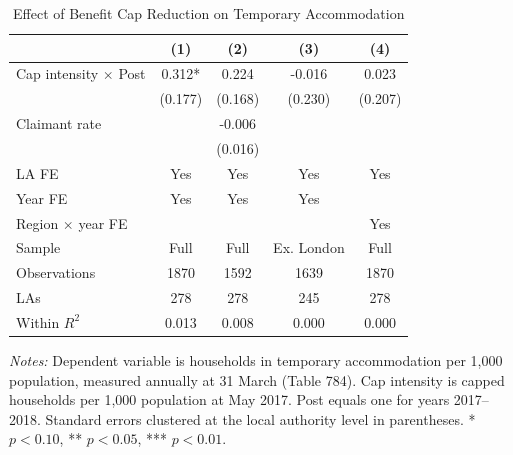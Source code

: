 \begin{table}[t]
\centering
\caption{Effect of Benefit Cap Reduction on Temporary Accommodation}
\label{tab:main}
\begin{tabular}{lcccc}
\toprule
& (1) & (2) & (3) & (4) \\
\midrule
Cap intensity $\times$ Post & 0.312* & 0.224 & -0.016 & 0.023 \\
& (0.177) & (0.168) & (0.230) & (0.207) \\
\addlinespace
Claimant rate & & -0.006 & & \\
& & (0.016) & & \\
\midrule
LA FE & Yes & Yes & Yes & Yes \\
Year FE & Yes & Yes & Yes & \\
Region $\times$ year FE & & & & Yes \\
Sample & Full & Full & Ex. London & Full \\
Observations & 1870 & 1592 & 1639 & 1870 \\
LAs & 278 & 278 & 245 & 278 \\
Within $R^2$ & 0.013 & 0.008 & 0.000 & 0.000 \\
\bottomrule
\end{tabular}
\begin{tablenotes}[flushleft]\footnotesize
\item \textit{Notes:} Dependent variable is households in temporary accommodation per 1,000 population, measured annually at 31 March (Table 784). Cap intensity is capped households per 1,000 population at May 2017. Post equals one for years 2017--2018. Standard errors clustered at the local authority level in parentheses. * $p < 0.10$, ** $p < 0.05$, *** $p < 0.01$.
\end{tablenotes}
\end{table}
